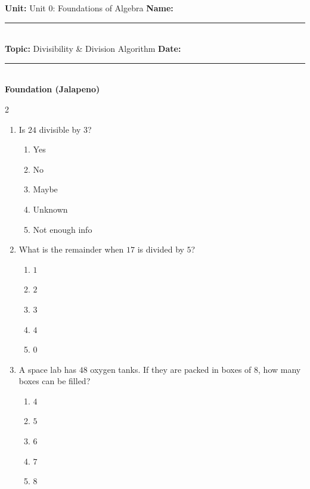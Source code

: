 \documentclass[10pt]{article}
\begin{document}
\enlargethispage{2.5cm}

\begin{tcolorbox}[colback=mainblue!5, colframe=mainblue, sharp corners, boxrule=0.5pt]
    \small \textbf{Unit:} Unit 0: Foundations of Algebra \hfill \textbf{Name:} \rule{3cm}{0.4pt} \\
    \small \textbf{Topic:} Divisibility & Division Algorithm \hfill \textbf{Date:} \rule{2cm}{0.4pt} \\
    \centering \textbf{\large Foundation (Jalapeno)}
\end{tcolorbox}

\vspace{0.2cm}

\begin{multicols}{2}
\begin{enumerate}[label=\textbf{Q\arabic*.}, leftmargin=*, itemsep=6pt, parsep=0pt]

  \item \small Is $24$ divisible by $3$?
  \begin{enumerate}[label=(\Alph*), leftmargin=0.6cm, nosep, itemsep=2pt]
    \item Yes
    \item No
    \item Maybe
    \item Unknown
    \item Not enough info
  \end{enumerate}

  \item \small What is the remainder when $17$ is divided by $5$?
  \begin{enumerate}[label=(\Alph*), leftmargin=0.6cm, nosep, itemsep=2pt]
    \item $1$
    \item $2$
    \item $3$
    \item $4$
    \item $0$
  \end{enumerate}

  \item \small A space lab has $48$ oxygen tanks. If they are packed in boxes of $8$, how many boxes can be filled?
  \begin{enumerate}[label=(\Alph*), leftmargin=0.6cm, nosep, itemsep=2pt]
    \item $4$
    \item $5$
    \item $6$
    \item $7$
    \item $8$
  \end{enumerate}


\end{enumerate}
\end{multicols}
\end{document}
